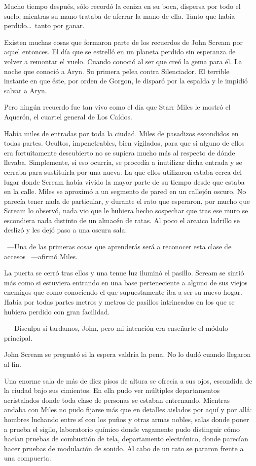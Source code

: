 Mucho tiempo después, sólo recordó la ceniza en su boca, dispersa por todo el suelo, mientras su mano trataba de aferrar la mano de ella. Tanto que había perdido\dots\ tanto por ganar.

\fancyparbreak
Existen muchas cosas que formaron parte de los recuerdos de John Scream por aquel entonces. El día que se estrelló en un planeta perdido sin esperanza de volver a remontar el vuelo. Cuando conoció al ser que creó la gema para él. La noche que conoció a Aryn. Su primera pelea contra Silenciador. El terrible instante en que éste, por orden de Gorgon, le disparó por la espalda y le impidió salvar a Aryn.

Pero ningún recuerdo fue tan vivo como el día que Starr Miles le mostró el Aquerón, el cuartel general de Los Caídos.

Había miles de entradas por toda la ciudad. Miles de pasadizos escondidos en todas partes. Ocultos, impenetrables, bien vigilados, para que si alguno de ellos era fortuitamente descubierto no se supiera mucho más al respecto de dónde llevaba. Simplemente, si eso ocurría, se procedía a inutilizar dicha entrada y se cerraba para sustituirla por una nueva. La que ellos utilizaron estaba cerca del lugar donde Scream había vivido la mayor parte de su tiempo desde que estaba en la calle. Miles se aproximó a un segmento de pared en un callejón oscuro. No parecía tener nada de particular, y durante el rato que esperaron, por mucho que Scream lo observó, nada vio que le hubiera hecho sospechar que tras ese muro se escondiera nada distinto de un almacén de ratas. Al poco el arcaico ladrillo se deslizó y les dejó paso a una oscura sala.

~---Una de las primeras cosas que aprenderás será a reconocer esta clase de accesos ~---afirmó Miles.

La puerta se cerró tras ellos y una tenue luz iluminó el pasillo. Scream se sintió más como si estuviera entrando en una base perteneciente a alguno de sus viejos enemigos que como conociendo el que supuestamente iba a ser su nuevo hogar. Había por todas partes metros y metros de pasillos intrincados en los que se hubiera perdido con gran facilidad.

~---Disculpa si tardamos, John, pero mi intención era enseñarte el módulo principal.

John Scream se preguntó si la espera valdría la pena. No lo dudó cuando llegaron al fin.

Una enorme sala de más de diez pisos de altura se ofrecía a sus ojos, escondida de la ciudad bajo sus cimientos. En ella pudo ver múltiples departamentos acristalados donde toda clase de personas se estaban entrenando. Mientras andaba con Miles no pudo fijarse más que en detalles aislados por aquí y por allá: hombres luchando entre sí con los puños y otras armas nobles, salas donde poner a prueba el sigilo, laboratorio químico donde vagamente pudo distinguir cómo hacían pruebas de combustión de tela, departamento electrónico, donde parecían hacer pruebas de modulación de sonido. Al cabo de un rato se pararon frente a una compuerta.

